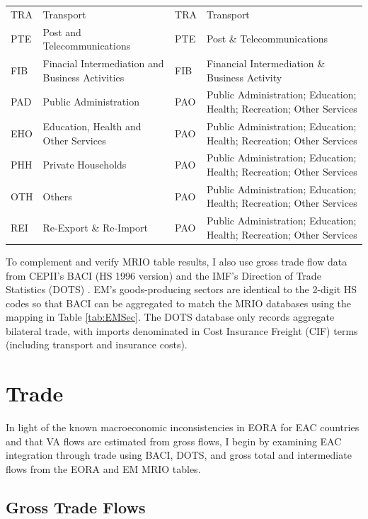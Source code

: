 \documentclass[a4paper]{article}
\begin{document}
\begin{table}[h!]
{\begin{tabular}{llll}
  TRA & Transport & TRA & Transport \\ 
  PTE & Post and Telecommunications & PTE & Post \& Telecommunications \\ 
  FIB & Finacial Intermediation and Business Activities & FIB & Financial Intermediation \& Business Activity \\ 
  PAD & Public Administration & PAO & Public Administration; Education; Health; Recreation; Other Services \\ 
  EHO & Education, Health and Other Services & PAO & Public Administration; Education; Health; Recreation; Other Services \\ 
  PHH & Private Households & PAO & Public Administration; Education; Health; Recreation; Other Services \\ 
  OTH & Others & PAO & Public Administration; Education; Health; Recreation; Other Services \\ 
  REI & Re-Export \& Re-Import & PAO & Public Administration; Education; Health; Recreation; Other Services \\ 
   \bottomrule
\end{tabular}
}
\end{table}
\FloatBarrier

To complement and verify MRIO table results, I also use gross trade flow data from CEPII's BACI \citep{CEPIIBACI} (HS 1996 version) and the IMF's Direction of Trade Statistics (DOTS) \citep{IMFDOTS}. EM's goods-producing sectors are identical to the 2-digit HS codes so that BACI can be aggregated to match the MRIO databases using the mapping in Table \ref{tab:EMSec}. The DOTS database only records aggregate bilateral trade, with imports denominated in Cost Insurance Freight (CIF) terms (including transport and insurance costs).  


\section{Trade}

In light of the known macroeconomic inconsistencies in EORA for EAC countries and that VA flows are estimated from gross flows, I begin by examining EAC integration through trade using BACI, DOTS, and gross total and intermediate flows from the EORA and EM MRIO tables. 

\subsection{Gross Trade Flows}
\end{document}
